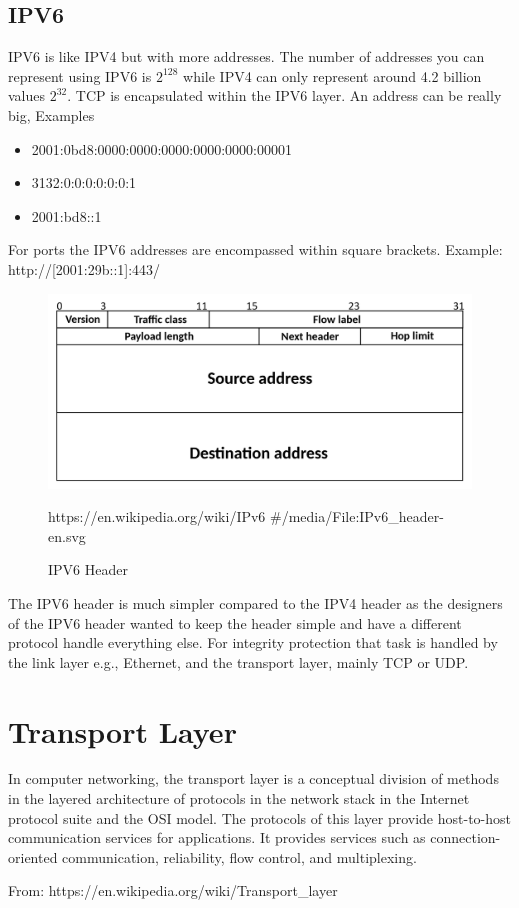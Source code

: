 \documentclass[../CMPUT-404-Notes.tex]{subfiles}
\begin{document}
\subsection{IPV6}
IPV6 is like IPV4 but with more addresses. The number of addresses you can represent using IPV6 is $2^{128}$ while IPV4 can only represent around 4.2 billion values $2^{32}$. 
TCP is encapsulated within the IPV6 layer.  
An address can be really big, Examples
\begin{itemize}
  \item 2001:0bd8:0000:0000:0000:0000:0000:00001
  \item 3132:0:0:0:0:0:0:1
  \item 2001:bd8::1
\end{itemize}
For ports the IPV6 addresses are encompassed within square brackets. Example: http://[2001:29b::1]:443/

\begin{figure}[!h]
  \centering
  \includegraphics[width=\columnwidth]{../assets/IPv6-header-en.png}
  \caption{IPV6 Header}
  https://en.wikipedia.org/wiki/IPv6 \#/media/File:IPv6\_header-en.svg
\end{figure}

\begin{Note}
  The IPV6 header is much simpler compared to the IPV4 header as the designers of the IPV6 header wanted to keep the header simple and have a different protocol handle everything else. For integrity protection that task is handled by the link layer e.g., Ethernet, and the transport layer, mainly TCP or UDP. 
\end{Note}

\section{Transport Layer}
\begin{quotebox}
  In computer networking, the transport layer is a conceptual division of methods in the layered architecture of protocols in the network stack in the Internet protocol suite and the OSI model. The protocols of this layer provide host-to-host communication services for applications. It provides services such as connection-oriented communication, reliability, flow control, and multiplexing.

  From: https://en.wikipedia.org/wiki/Transport\_layer
\end{quotebox}
\end{document}
